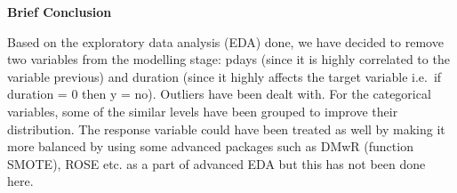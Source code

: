 \documentclass[
]{article}
\newenvironment{Shaded}{\begin{snugshade}}{\end{snugshade}}
\newcommand{\AttributeTok}[1]{\textcolor[rgb]{0.77,0.63,0.00}{#1}}
\newcommand{\FunctionTok}[1]{\textcolor[rgb]{0.00,0.00,0.00}{#1}}
\newcommand{\NormalTok}[1]{#1}
\newcommand{\OtherTok}[1]{\textcolor[rgb]{0.56,0.35,0.01}{#1}}
\newcommand{\SpecialCharTok}[1]{\textcolor[rgb]{0.00,0.00,0.00}{#1}}
\newcommand{\StringTok}[1]{\textcolor[rgb]{0.31,0.60,0.02}{#1}}
\begin{document}
\begin{Shaded}
\end{Shaded}

\textbf{Brief Conclusion}

Based on the exploratory data analysis (EDA) done, we have decided to
remove two variables from the modelling stage: pdays (since it is highly
correlated to the variable previous) and duration (since it highly
affects the target variable i.e.~if duration = 0 then y = no). Outliers
have been dealt with. For the categorical variables, some of the similar
levels have been grouped to improve their distribution. The response
variable could have been treated as well by making it more balanced by
using some advanced packages such as DMwR (function SMOTE), ROSE etc. as
a part of advanced EDA but this has not been done here.
\end{document}
